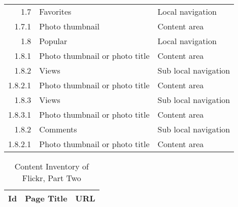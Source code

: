 \documentclass[11pt,a4paper]{article}
\begin{document}
\begin{table}[h!b!p!]
\begin{center}
\begin{small}
\begin{tabular}{|r|l|l|}
              1.7 &
              Favorites &
              Local navigation \\

                1.7.1 &
                Photo thumbnail &
                Content area \\

              1.8 &
              Popular &
              Local navigation \\

                1.8.1 &
                Photo thumbnail or photo title &
                Content area \\

                1.8.2 &
                Views &
                Sub local navigation \\

                  1.8.2.1 &
                  Photo thumbnail or photo title &
                  Content area \\

                1.8.3 &
                Views &
                Sub local navigation \\

                  1.8.3.1 &
                  Photo thumbnail or photo title &
                  Content area \\

                1.8.2 &
                Comments &
                Sub local navigation \\

                  1.8.2.1 &
                  Photo thumbnail or photo title &
                  Content area \\
        \hline

      \end{tabular}
    \end{small}
  \end{center}
\end{table}


\begin{table}[h!b!p!]
  \caption{Content Inventory of Flickr, Part Two}
  \label{table:flickr.content.inventory.2.1}
  \begin{adjustwidth}{-8em}{-8em}
    \begin{center}
      \begin{small}
        \begin{tabular}{|r|l|l|}
          \hline
          Id &
          Page Title &
          URL \\

          \hline


          \hline

        \end{tabular}
      \end{small}
    \end{center}
  \end{adjustwidth}
\end{table}
\end{document}
